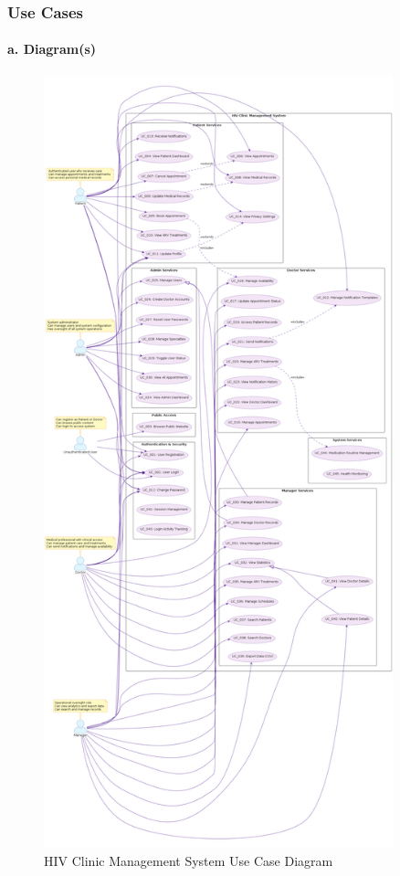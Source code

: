 \documentclass[12pt,a4paper]{article}
\begin{document}
\subsubsection{Use Cases}

\paragraph{a. Diagram(s)}

\begin{figure}[H]
\centering
\includegraphics[width=0.9\textwidth]{diagrams/use_case_diagram.png}
\caption{HIV Clinic Management System Use Case Diagram}
\label{fig:use-case-diagram}
\end{figure}
\end{document}
